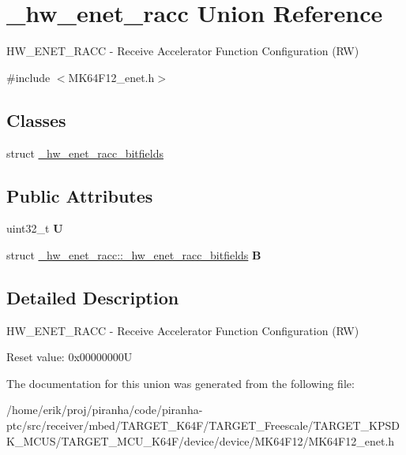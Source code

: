\hypertarget{union__hw__enet__racc}{}\section{\+\_\+hw\+\_\+enet\+\_\+racc Union Reference}
\label{union__hw__enet__racc}


H\+W\+\_\+\+E\+N\+E\+T\+\_\+\+R\+A\+CC -\/ Receive Accelerator Function Configuration (RW)  




{\ttfamily \#include $<$M\+K64\+F12\+\_\+enet.\+h$>$}

\subsection*{Classes}
\begin{DoxyCompactItemize}
\item 
struct \hyperlink{struct__hw__enet__racc_1_1__hw__enet__racc__bitfields}{\+\_\+hw\+\_\+enet\+\_\+racc\+\_\+bitfields}
\end{DoxyCompactItemize}
\subsection*{Public Attributes}
\begin{DoxyCompactItemize}
\item 
uint32\+\_\+t {\bfseries U}\hypertarget{union__hw__enet__racc_ab106097ac3dd28669aef3b48f55d7f48}{}\label{union__hw__enet__racc_ab106097ac3dd28669aef3b48f55d7f48}

\item 
struct \hyperlink{struct__hw__enet__racc_1_1__hw__enet__racc__bitfields}{\+\_\+hw\+\_\+enet\+\_\+racc\+::\+\_\+hw\+\_\+enet\+\_\+racc\+\_\+bitfields} {\bfseries B}\hypertarget{union__hw__enet__racc_a028abdb87db31f5d6ea4fe10d837532f}{}\label{union__hw__enet__racc_a028abdb87db31f5d6ea4fe10d837532f}

\end{DoxyCompactItemize}


\subsection{Detailed Description}
H\+W\+\_\+\+E\+N\+E\+T\+\_\+\+R\+A\+CC -\/ Receive Accelerator Function Configuration (RW) 

Reset value\+: 0x00000000U 

The documentation for this union was generated from the following file\+:\begin{DoxyCompactItemize}
\item 
/home/erik/proj/piranha/code/piranha-\/ptc/src/receiver/mbed/\+T\+A\+R\+G\+E\+T\+\_\+\+K64\+F/\+T\+A\+R\+G\+E\+T\+\_\+\+Freescale/\+T\+A\+R\+G\+E\+T\+\_\+\+K\+P\+S\+D\+K\+\_\+\+M\+C\+U\+S/\+T\+A\+R\+G\+E\+T\+\_\+\+M\+C\+U\+\_\+\+K64\+F/device/device/\+M\+K64\+F12/M\+K64\+F12\+\_\+enet.\+h\end{DoxyCompactItemize}
